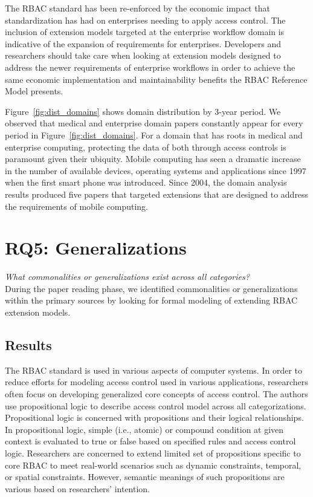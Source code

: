 The RBAC standard has been re-enforced by the economic impact that standardization has had on enterprises needing to apply access control.  The
inclusion of extension models targeted at the enterprise workflow domain is indicative of the expansion of requirements for enterprises. Developers
and researchers should take care when looking at extension models designed to address the newer requirements of enterprise workflows in order to
achieve the same economic implementation and maintainability benefits the RBAC Reference Model presents.

Figure~\ref{fig:dist_domains} shows domain distribution by 3-year period.
We observed that medical and enterprise domain papers constantly appear for every period in Figure~\ref{fig:dist_domains}.
For a domain that has roots in medical and enterprise computing, protecting the data of both through access controls is paramount given their ubiquity. 
Mobile computing has seen a dramatic increase in the number of available devices, operating systems and applications since 1997 when the first smart phone was introduced. Since 2004, the domain analysis results produced five papers that targeted extensions that are designed to address the requirements of mobile computing. 


\section{RQ5: Generalizations} \label{sec:generalizations}

\textit{What commonalities or generalizations exist across all categories?}
\\

During the paper reading phase, we identified commonalities or generalizations within the primary sources by looking for formal modeling of extending RBAC extension models.

\subsection{Results}

The RBAC standard is used in various aspects of computer systems. In order to reduce efforts for modeling access control used in various applications, researchers often focus on developing generalized core concepts of access control.
The authors use propositional logic to describe access control model across all categorizations. Propositional logic is concerned with propositions and their logical relationships. In propositional logic, simple (i.e., atomic) or compound condition at given context is evaluated to true or false based on specified rules and access control logic. Researchers are concerned to extend limited set of propositions specific to core RBAC to meet real-world scenarios such as dynamic constraints, temporal, or spatial constraints. However, semantic meanings of such propositions are various based on researchers' intention.

